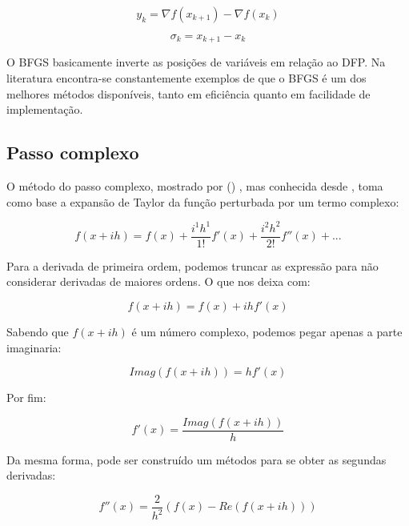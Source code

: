 \begin{equation}
y_k = \nabla f(x_{k+1}) - \nabla f(x_k)
\end{equation}

\begin{equation}
\sigma_k = x_{k+1} - x_k
\end{equation}

O BFGS basicamente inverte as posições de variáveis em relação ao DFP.
Na literatura encontra-se constantemente exemplos de que o BFGS é um dos melhores
métodos disponíveis, tanto em eficiência quanto em facilidade de implementação.




\subsection{Passo complexo}
O método do passo complexo, mostrado por \citeauthor{Lai_2005} (\citeyear{Lai_2005}) , mas
conhecida desde \citeyear{Lyness_1967}, toma como base a expansão de Taylor da função
perturbada por um termo complexo:

\begin{equation}
f(x + ih) = f(x) + \frac{i^1h^1}{1!}f'(x) + \frac{i^2h^2}{2!} f''(x) + ...
\end{equation}

Para a derivada de primeira ordem, podemos truncar as expressão para não considerar derivadas
de maiores ordens. O que nos deixa com:


\begin{equation}
f(x + ih) = f(x) + ihf'(x)
\end{equation}

Sabendo que \(f(x+ih)\) é um número complexo, podemos pegar apenas a parte imaginaria:

\begin{equation}
Imag(f(x + ih)) = hf'(x)
\end{equation}

Por fim:

\begin{equation}
f'(x) = \frac{Imag(f(x + ih))}{h}
\end{equation}

Da mesma forma, pode ser construído um métodos para se obter as segundas derivadas:

\begin{equation}
f''(x) = \frac{2}{h^2} (f(x) - Re(f(x+ih)))
\end{equation}

